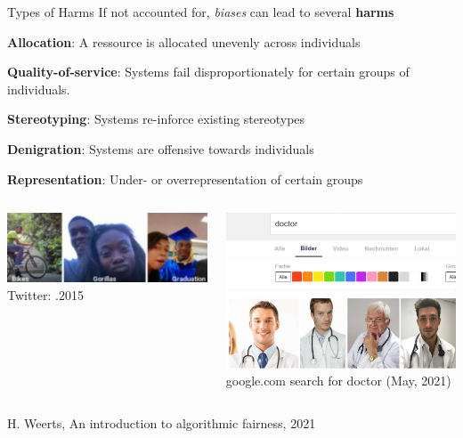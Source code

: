 \documentclass[11pt,compress,t,notes=noshow, xcolor=table]{beamer}
\begin{document}
\begin{vbframe}{Types of Harms}
  If not accounted for, \textit{biases} can lead to several \textbf{harms}
  \begin{itemize}
  \begin{small}
  \item \textbf{Allocation}: A ressource is allocated unevenly across individuals
  \item \textbf{Quality-of-service}: Systems fail disproportionately for certain groups of individuals.
  \item \textbf{Stereotyping}: Systems re-inforce existing stereotypes
  \item \textbf{Denigration}: Systems are offensive towards individuals
  \item \textbf{Representation}: Under- or overrepresentation of certain groups
  \end{small}
  \end{itemize}

\begin{columns} 
\begin{column}{0.5\textwidth}
\begin{center}
\vfill
 \includegraphics[height=0.25\textheight]{figures/gorilla.png}
 \tiny{Twitter: .2015}
 \vfill
\end{center}
\end{column}
\begin{column}{0.5\textwidth}
\begin{center}
 \vspace{-0.5cm}
 \includegraphics[height=0.3\textheight]{figures/doctor.png}
 \tiny{google.com search for doctor (May, 2021)}
\end{center}
\end{column}
\end{columns}
\vfill
\tiny{H. Weerts, An introduction to algorithmic fairness, 2021}
\end{vbframe}
\end{document}
